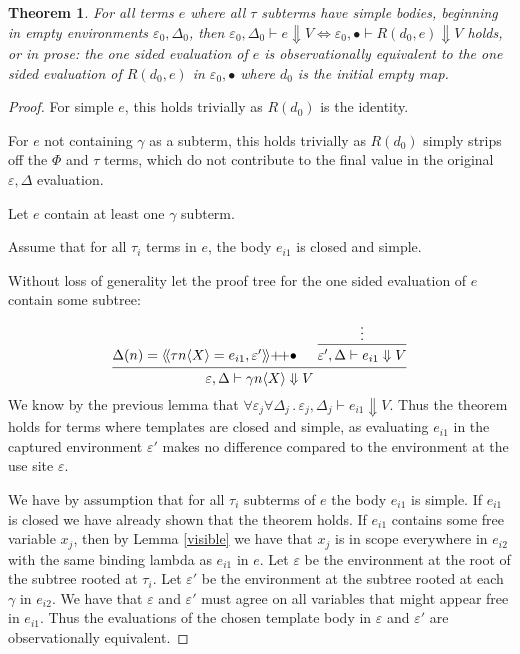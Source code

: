 \documentclass{article}
\newcommand{\la}{\langle}
\newcommand{\ra}{\rangle}
\newcommand{\lda}{\langle\!\langle}
\newcommand{\rda}{\rangle\!\rangle}
\newcommand{\ve}{\varepsilon}
\newcommand{\de}{\Delta}
\newcommand{\hole}{\bullet}
\newcommand{\st}{\,.\,}
\newcommand{\pp}{{+}\!{+}}
\newcommand{\da}{\Downarrow}
\newcommand{\vd}{\vdash}
\newtheorem{theorem}{Theorem}[section]
\begin{document}
\begin{theorem}
  For all terms $e$ where all $\tau$ subterms have simple bodies, beginning in empty environments $\ve_0,\de_0$, then $\ve_0,\de_0 \vd e \da V \iff \ve_0,\hole \vd R(d_0, e) \da V$ holds, or in prose: the one sided evaluation of $e$ is observationally equivalent to the one sided evaluation of $R(d_0,e)$ in $\ve_0,\hole$ where $d_0$ is the initial empty map.
\end{theorem}
\begin{proof}
  For simple $e$, this holds trivially as $R(d_0)$ is the identity.

  For $e$ not containing $\gamma$ as a subterm, this holds trivially as $R(d_0)$ simply strips off the $\Phi$ and $\tau$ terms, which do not contribute to the final value in the original $\ve,\de$ evaluation.

  Let $e$ contain at least one $\gamma$ subterm.
  
  Assume that for all $\tau_i$ terms in $e$, the body $e_{i1}$ is closed and simple.

  Without loss of generality let the proof tree for the one sided evaluation of $e$ contain some subtree:
  \begin{displaymath}
    \begin{prooftree}
      \hypo{\de(n) = \lda \tau n\la X\ra = e_{i1} , \ve' \rda \pp \hole}
      \hypo{\vdots}
      \infer1{\ve',\de \vd e_{i1} \da V}
      \infer2{\ve,\de\vd \gamma n \la X \ra \da V}
    \end{prooftree}    
  \end{displaymath}
  We know by the previous lemma that $\forall \ve_j\forall \de_j \st \ve_j,\de_j \vd e_{i1} \da V$. Thus the theorem holds for terms where templates are closed and simple, as evaluating $e_{i1}$ in the captured environment $\ve'$ makes no difference compared to the environment at the use site $\ve$.

  We have by assumption that for all $\tau_i$ subterms of $e$ the body $e_{i1}$ is simple. If $e_{i1}$ is closed we have already shown that the theorem holds. If $e_{i1}$ contains some free variable $x_j$, then by Lemma \ref{visible} we have that $x_j$ is in scope everywhere in $e_{i2}$ with the same binding lambda as $e_{i1}$ in $e$. Let $\ve$ be the environment at the root of the subtree rooted at $\tau_i$. Let $\ve'$ be the environment at the subtree rooted at each $\gamma$ in $e_{i2}$. We have that $\ve$ and $\ve'$ must agree on all variables that might appear free in $e_{i1}$. Thus the evaluations of the chosen template body in $\ve$ and $\ve'$ are observationally equivalent. 
\end{proof}
\end{document}
